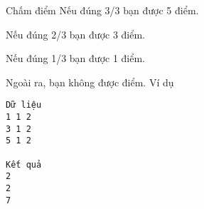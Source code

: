 Chấm điểm
Nếu đúng 3/3 bạn được 5 điểm.

Nếu đúng 2/3 bạn được 3 điểm.

Nếu đúng 1/3 bạn được 1 điểm.

Ngoài ra, bạn không được điểm.
Ví dụ
\begin{verbatim}
Dữ liệu
1 1 2
3 1 2
5 1 2

Kết quả
2
2
7
\end{verbatim}